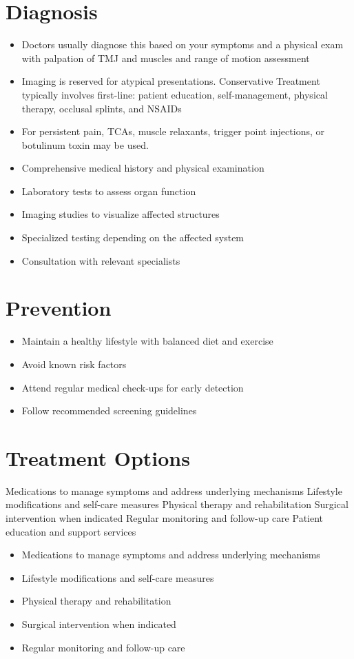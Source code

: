 \section{Diagnosis}
\begin{itemize}[noitemsep]
  \item Doctors usually diagnose this based on your symptoms and a physical exam with palpation of TMJ and muscles and range of motion assessment
  \item Imaging is reserved for atypical presentations. Conservative Treatment typically involves first-line: patient education, self-management, physical therapy, occlusal splints, and NSAIDs
  \item For persistent pain, TCAs, muscle relaxants, trigger point injections, or botulinum toxin may be used.
  \item Comprehensive medical history and physical examination
  \item Laboratory tests to assess organ function
  \item Imaging studies to visualize affected structures
  \item Specialized testing depending on the affected system
  \item Consultation with relevant specialists
\end{itemize}
\section{Prevention}
\begin{itemize}[noitemsep]
  \item Maintain a healthy lifestyle with balanced diet and exercise
  \item Avoid known risk factors
  \item Attend regular medical check-ups for early detection
  \item Follow recommended screening guidelines
\end{itemize}
\section{Treatment Options}
Medications to manage symptoms and address underlying mechanisms Lifestyle modifications and self-care measures Physical therapy and rehabilitation Surgical intervention when indicated Regular monitoring and follow-up care Patient education and support services

\begin{itemize}[noitemsep]
  \item Medications to manage symptoms and address underlying mechanisms
  \item Lifestyle modifications and self-care measures
  \item Physical therapy and rehabilitation
  \item Surgical intervention when indicated
  \item Regular monitoring and follow-up care
\end{itemize}
